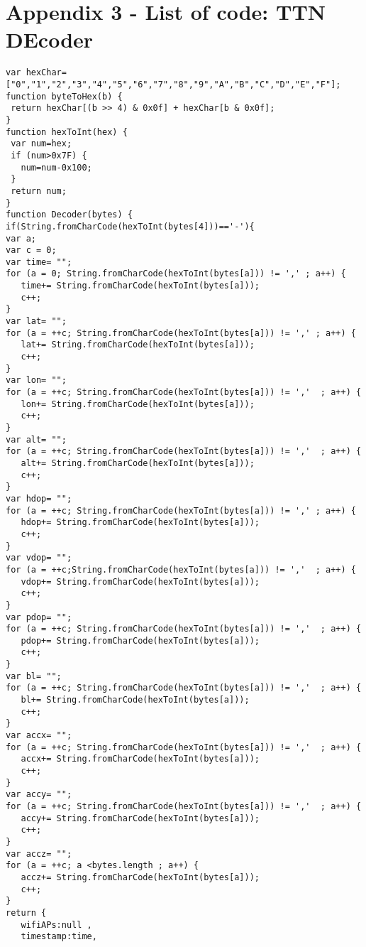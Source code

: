 \chapter{Appendix 3 - List of code: TTN DEcoder }
\label{app:TTN_decoder}

\lstset{language=Python, caption=TTN Decoder, label=lst:ttn}
\begin{lstlisting}
var hexChar=["0","1","2","3","4","5","6","7","8","9","A","B","C","D","E","F"];
function byteToHex(b) {
 return hexChar[(b >> 4) & 0x0f] + hexChar[b & 0x0f];
}
function hexToInt(hex) {
 var num=hex;
 if (num>0x7F) {
   num=num-0x100;
 }
 return num;
}
function Decoder(bytes) {
if(String.fromCharCode(hexToInt(bytes[4]))=='-'){
var a;
var c = 0;
var time= "";
for (a = 0; String.fromCharCode(hexToInt(bytes[a])) != ',' ; a++) {
   time+= String.fromCharCode(hexToInt(bytes[a]));
   c++;
}
var lat= "";
for (a = ++c; String.fromCharCode(hexToInt(bytes[a])) != ',' ; a++) {
   lat+= String.fromCharCode(hexToInt(bytes[a]));
   c++;
}
var lon= "";
for (a = ++c; String.fromCharCode(hexToInt(bytes[a])) != ','  ; a++) {
   lon+= String.fromCharCode(hexToInt(bytes[a]));
   c++;
}
var alt= "";
for (a = ++c; String.fromCharCode(hexToInt(bytes[a])) != ','  ; a++) {
   alt+= String.fromCharCode(hexToInt(bytes[a]));
   c++;
}
var hdop= "";
for (a = ++c; String.fromCharCode(hexToInt(bytes[a])) != ',' ; a++) {
   hdop+= String.fromCharCode(hexToInt(bytes[a]));
   c++;
}
var vdop= "";
for (a = ++c;String.fromCharCode(hexToInt(bytes[a])) != ','  ; a++) {
   vdop+= String.fromCharCode(hexToInt(bytes[a]));
   c++;
}
var pdop= "";
for (a = ++c; String.fromCharCode(hexToInt(bytes[a])) != ','  ; a++) {
   pdop+= String.fromCharCode(hexToInt(bytes[a]));
   c++;
}
var bl= "";
for (a = ++c; String.fromCharCode(hexToInt(bytes[a])) != ','  ; a++) {
   bl+= String.fromCharCode(hexToInt(bytes[a]));
   c++;
}
var accx= "";
for (a = ++c; String.fromCharCode(hexToInt(bytes[a])) != ','  ; a++) {
   accx+= String.fromCharCode(hexToInt(bytes[a]));
   c++;
}
var accy= "";
for (a = ++c; String.fromCharCode(hexToInt(bytes[a])) != ','  ; a++) {
   accy+= String.fromCharCode(hexToInt(bytes[a]));
   c++;
}
var accz= "";
for (a = ++c; a <bytes.length ; a++) {
   accz+= String.fromCharCode(hexToInt(bytes[a]));
   c++;
}
return {
   wifiAPs:null ,
   timestamp:time,

\end{lstlisting}
